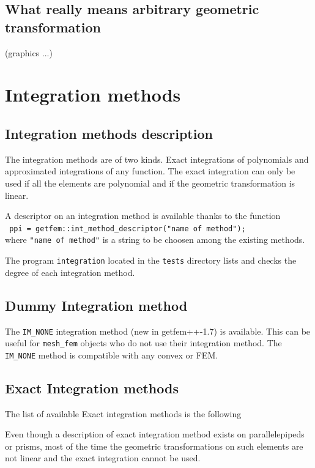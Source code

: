 \documentclass[11pt,a4paper]{article}
\begin{document}
\subsection{What really means arbitrary geometric transformation}

(graphics ...)

\section{Integration methods}

\subsection{Integration methods description}

The integration methods are of two kinds. Exact integrations of polynomials and approximated integrations of any function. The exact integration can only be used if all the elements are polynomial and if the geometric transformation is linear.

 A descriptor on an integration method is available thanks to the function\\[0.5cm]
{\tt
  ppi = getfem::int\_method\_descriptor("name of method");
}\\[0.5cm]
where {\tt "name of method"} is a string to be choosen among the existing methods.

The program \texttt{integration} located in the \texttt{tests} directory lists and checks the degree of each integration method.

\subsection{Dummy Integration method}
The {\tt IM\_NONE} integration method (new in getfem++-1.7) is available. This can be useful for \texttt{mesh\_fem} objects who do not use their integration method. The {\tt IM\_NONE} method is compatible with any convex or FEM.

\subsection{Exact Integration methods}

The list of available Exact integration methods is the following



Even though a description of exact integration method exists on parallelepipeds or prisms, most of the time the geometric transformations on such elements are not linear and the exact integration cannot be used.
\end{document}
